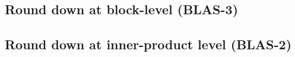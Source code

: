 \subsection{Round down at block-level (BLAS-3)}\label{sec:mp-b}
\subsection{Round down at inner-product level (BLAS-2)}\label{sec:mp-2}





























